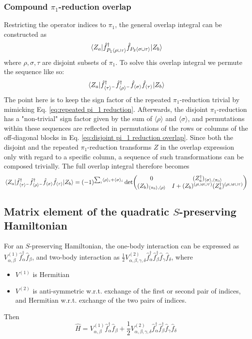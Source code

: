 \documentclass[12pt]{article}
\newcommand{\seq}[1]{\langle #1\rangle}
\newcommand{\hc}{^\dagger}
\begin{document}
	\subsubsection{Compound $\pi_1$-reduction overlap}
	Restricting the operator indices to $\pi_1$, the general overlap integral can be constructed as
	\begin{equation}
	\mel{Z_a}{\hat{f}\hc_{P_1\seq{\rho\cup\tau}}\hat{f}_{P_2\seq{\sigma\cup\tau}}}{Z_b}
	\end{equation}
	where $\rho,\sigma,\tau$ are disjoint subsets of $\pi_1$. To solve this overlap integral we permute the sequence like so:
	\begin{equation}
	\mel{Z_a}{\hat{f}\hc_{\seq{\tau}^-}\hat{f}\hc_{\seq{\rho}^-}\hat{f}_{\seq{\sigma}}\hat{f}_{\seq{\tau}}}{Z_b}
	\end{equation}
	The point here is to keep the sign factor of the repeated $\pi_1$-reduction trivial by mimicking Eq. \ref{eq:repeated pi_1 reduction}. Afterwards, the disjoint $\pi_1$-reduction has a "non-trivial" sign factor given by the sum of $\seq{\rho}$ and $\seq{\sigma}$, and permutations within these sequences are reflected in permutations of the rows or columns of the off-diagonal blocks in Eq. \ref{eq:disjoint pi_1 reduction overlap}. Since both the disjoint and the repeated $\pi_1$-reduction transforms $Z$ in the overlap expression only with regard to a specific column, a sequence of such transformations can be composed trivially. The full overlap integral therefore becomes
	\begin{equation} \label{eq:compound pi_1 reduction overlap}
	\mel{Z_a}{\hat{f}\hc_{\seq{\tau}^-}\hat{f}\hc_{\seq{\rho}^-}\hat{f}_{\seq{\sigma}}\hat{f}_{\seq{\tau}}}{Z_b} = (-1)^{\sum_i\seq{\rho}_i + \seq{\sigma}_i}\det(\mqty{
		0 & (Z_a\hc)_{\seq{\sigma}, \seq{\pi_0}}\\
		(Z_b)_{\seq{\pi_0},\seq{\rho}} & I+(Z_b)^{(\rho\cup\sigma\cup\tau)} (Z_a\hc)^{(\rho\cup \sigma\cup\tau)}
	})
	\end{equation}
	
	\subsection{Matrix element of the quadratic $S$-preserving Hamiltonian}
	For an $S$-preserving Hamiltonian, the one-body interaction can be expressed as $V^{(1)}_{\alpha,\beta}\hat{f}\hc_\alpha\hat{f}_\beta$, and two-body interaction as $\frac{1}{2}V^{(2)}_{\alpha,\beta,\gamma,\delta}\hat{f}\hc_\alpha\hat{f}\hc_\beta\hat{f}_\gamma\hat{f}_\delta$, where
	\begin{itemize}
	\item $V^{(1)}$ is Hermitian
	\item $V^{(2)}$ is anti-symmetric w.r.t. exchange of the first or second pair of indices, and Hermitian w.r.t. exchange of the two pairs of indices.
	\end{itemize}
	Then
	\begin{equation}
	\hat{H}=V^{(1)}_{\alpha,\beta}\hat{f}\hc_\alpha\hat{f}_\beta+\frac{1}{2}V^{(2)}_{\alpha,\beta,\gamma,\delta}\hat{f}\hc_\alpha\hat{f}\hc_\beta\hat{f}_\gamma\hat{f}_\delta
	\end{equation}
	
\end{document}
